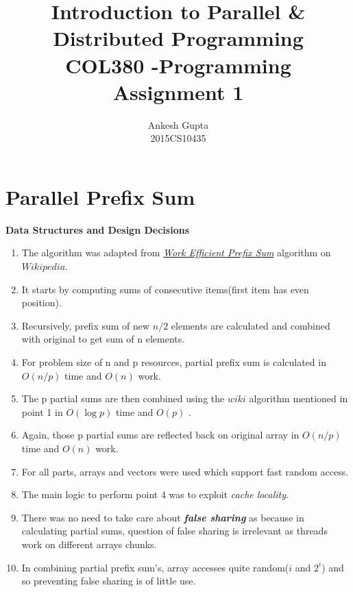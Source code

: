 \documentclass{article}
\newcommand{\bld}[1]{\textbf{#1}}
\newcommand{\ital}[1]{\textit{#1}}
\newcommand{\italb}[1]{\textbf{\textit{{#1}}}}
\begin{document}
\title{Introduction to Parallel \&
Distributed Programming\\COL380 -Programming Assignment 1}
\author{Ankesh Gupta\\2015CS10435}

\date{}
\maketitle

\section*{Parallel Prefix Sum}

\bld{Data Structures and Design Decisions}
\begin{enumerate}
\item The algorithm was adapted from \href{https://en.wikipedia.org/wiki/Prefix_sum}{\ital{Work Efficient Prefix Sum}} algorithm on $Wikipedia$.
\item It starts by computing sums of consecutive items(first item has even position).
\item Recursively, prefix sum of new $n/2$ elements are calculated and combined with original to get sum of n elements.
\item For problem size of n and p resources, partial prefix sum is calculated in $O(n/p)$ time and $O(n)$ work.
\item The p partial sums are then combined using the $wiki$ algorithm mentioned in point 1 in $O(\log{p})$ time and $O(p)$ .
\item Again, those p partial sums are reflected back on original array in $O(n/p)$ time and $O(n)$ work.
\item For all parts, arrays and vectors were used which support fast random access.
\item The main logic to perform point 4 was to exploit \ital{cache locality}.
\item There was no need to take care about \italb{false sharing} as because in calculating partial sums, question of false sharing is irrelevant as threads work on different arrays chunks.
\item In combining partial prefix sum's, array accesses quite random($i$ and $2^i$) and so preventing false sharing is of little use.
\end{enumerate}  
\end{document}
